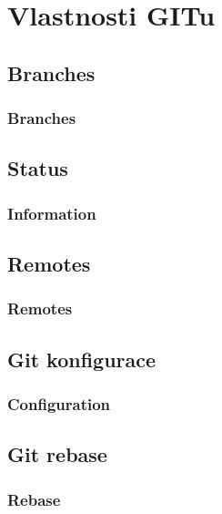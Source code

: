 \section{Vlastnosti GITu}
\subsection{Branches}


\begin{frame}
	\frametitle{Branches}
\end{frame}

\subsection{Status}


\begin{frame}
	\frametitle{Information}
\end{frame}


\subsection{Remotes}


\begin{frame}
	\frametitle{Remotes}
\end{frame}


\subsection{Git konfigurace}

% 

\begin{frame}
	\frametitle{Configuration}
\end{frame}


\subsection{Git rebase}


\begin{frame}
	\frametitle{Rebase}
\end{frame}

